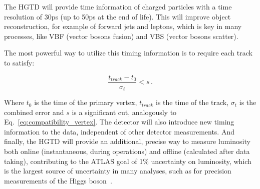 
The HGTD will provide time information of charged particles with a time resolution of 30ps (up to 50ps at the end of life). %
This will improve object reconstruction, for example of forward jets and leptons, which is key in many processes, like VBF (vector bosons fusion) and VBS (vector bosons scatter). %

The most powerful way to utilize this timing information is to require each track to satisfy:

\begin{equation}
    \frac{t_{track}-t_0}{\sigma_t} < s \,.
\end{equation}

Where \(t_0\) is the time of the primary vertex, \(t_{track}\) is the time of the track, \(\sigma_t\) is the combined error and \(s\) is a significant cut, analogously to Eq.~\ref{eq:compatibility_vertex}. %
The detector will also introduce new timing information to the data, independent of other detector measurements. And finally, the HGTD will provide an additional, precise way to measure luminosity both online (instantaneous, during operations) and offline (calculated after data taking), contributing to the ATLAS goal of 1\% uncertainty on luminosity, which is the largest source of uncertainty in many analyses, such as for precision measurements of the Higgs boson~\cite{CERN-LHCC-2020-007}.



